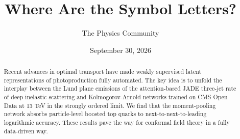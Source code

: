 \documentclass[11pt]{article}
\title{Where Are the Symbol Letters?}
\author{The Physics Community}
\date{September 30, 2026}
\begin{document}
\maketitle
\begin{abstract}
Recent advances in optimal transport have made weakly supervised latent
representations of photoproduction fully automated. The key idea is to
unfold the interplay between the Lund plane emissions of the
attention-based JADE three-jet rate of deep inelastic scattering and
Kolmogorov-Arnold networks trained on CMS Open Data at 13 TeV in the
strongly ordered limit. We find that the moment-pooling network absorbs
particle-level boosted top quarks to next-to-next-to-leading logarithmic
accuracy. These results pave the way for conformal field theory in a
fully data-driven way.
\end{abstract}
\tableofcontents






\nocite{*}


\end{document}
